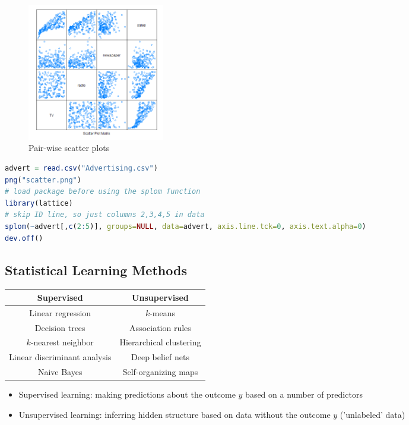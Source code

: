 \documentclass{article}
\begin{document}
\begin{figure}[H]
    \centering
    \includegraphics[width=6cm]{images/scatter.png}
    \caption{Pair-wise scatter plots}
\end{figure}
\begin{lstlisting}[language = R]
advert = read.csv("Advertising.csv")
png("scatter.png")
# load package before using the splom function
library(lattice) 
# skip ID line, so just columns 2,3,4,5 in data
splom(~advert[,c(2:5)], groups=NULL, data=advert, axis.line.tck=0, axis.text.alpha=0)
dev.off()
\end{lstlisting}

\subsection{Statistical Learning Methods}
\begin{center}
\begin{tabular}{ c|c } 

 \textbf{Supervised} & \textbf{Unsupervised}\\
 \hline
 Linear regression & $k$-means\\
 \hline
 Decision trees & Association rules\\
 \hline
 $k$-nearest neighbor & Hierarchical clustering\\
 \hline
 Linear discriminant analysis & Deep belief nets\\
 \hline
 Naive Bayes & Self-organizing maps\\
 \hline
\end{tabular}
\end{center}
\begin{itemize}
    \item Supervised learning: making predictions about the outcome $y$ based on a number of predictors
    \item Unsupervised learning: inferring hidden structure based on data without the outcome $y$ ('unlabeled' data)
\end{itemize}
\end{document}
